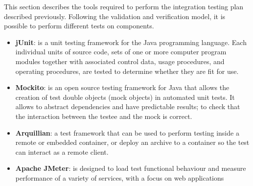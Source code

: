 This section describes the tools required to perform the integration testing plan described previously.
Following the validation and verification model, it is possible to perform different tests on components.

\begin{itemize}
	\item \textbf{jUnit}: is a unit testing framework for the Java programming language. Each individual units of source code, sets of one or more computer program modules together with associated control data, usage procedures, and operating procedures, are tested to determine whether they are fit for use.
	\item \textbf{Mockito}: is an open source testing framework for Java that allows the creation of test double objects (mock objects) in automated unit tests. It allows to abstract dependencies and have predictable results; to check that the interaction between the testee and the mock is correct. 
	\item \textbf{Arquillian}: a test framework that can be used to perform testing inside a remote or embedded container, or deploy an archive to a container so the test can interact as a remote client.
	\item \textbf{Apache JMeter}: is designed to load test functional behaviour and measure performance of a variety of services, with a focus on web applications
\end{itemize}
